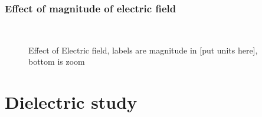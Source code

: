 \subsubsection{Effect of magnitude of electric field}

\begin{figure}%
    \centering
    \\
    \caption{Effect of Electric field, labels are magnitude in [put units here], bottom is zoom}
    \label{fig:efield effect}
 \end{figure}

 \section{Dielectric study}

